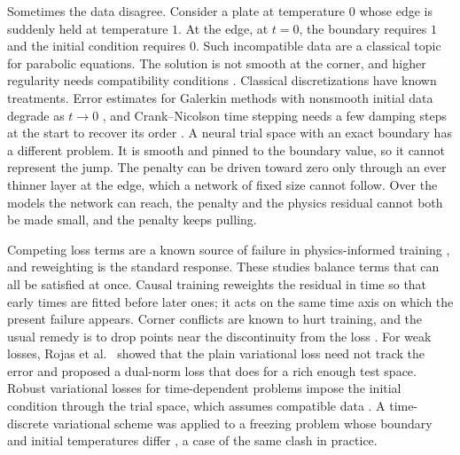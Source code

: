 \documentclass[a4paper,fleqn]{cas-sc}
\begin{document}
Sometimes the data disagree. Consider a plate at temperature $0$ whose edge is suddenly held at temperature $1$. At the
edge, at $t=0$, the boundary requires $1$ and the initial condition requires $0$. Such incompatible data are a classical
topic for parabolic equations. The solution is not smooth at the corner, and higher regularity needs compatibility
conditions \cite{ladyzhenskaya1968}. Classical discretizations have known treatments. Error estimates for Galerkin
methods with nonsmooth initial data degrade as $t\to0$ \cite{thomee2006}, and Crank--Nicolson time stepping needs a few
damping steps at the start to recover its order \cite{luskin1982,rannacher1984}. A neural trial space with an exact
boundary has a different problem. It is smooth and pinned to the boundary value, so it cannot represent the jump. The
penalty can be driven toward zero only through an ever thinner layer at the edge, which a network of fixed size cannot
follow. Over the models the network can reach, the penalty and the physics residual cannot both be made small, and the
penalty keeps pulling.

Competing loss terms are a known source of failure in physics-informed training
\cite{wang2021gradientflow,wang2022ntk,krishnapriyan2021failure}, and reweighting is the standard response. These studies
balance terms that can all be satisfied at once. Causal training \cite{wang2024causality} reweights the residual in
time so that early times are fitted before later ones; it acts on the same time axis on which the present failure
appears. Corner conflicts are known to hurt training, and the usual remedy is to
drop points near the discontinuity from the loss \cite{stiffreview}. For weak losses, Rojas et al.\ \cite{rojas2024rvpinn}
showed that the plain variational loss need not track the error and proposed a dual-norm loss that does for a rich
enough test space. Robust variational losses for time-dependent problems impose the initial condition through the trial
space, which assumes compatible data \cite{sikora2026crvpinn}. A time-discrete variational scheme was applied to a
freezing problem whose boundary and initial temperatures differ \cite{timediscrete2026}, a case of the same clash in
practice.
\end{document}
